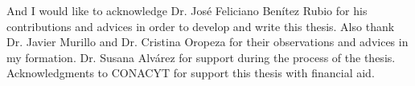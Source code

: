 
\begin{acknowledgements}      

And I would like to acknowledge Dr. Jos\'e Feliciano Ben\'itez Rubio for his contributions and advices in order to develop  and write this thesis. Also thank Dr. Javier Murillo and  Dr. Cristina Oropeza for their observations and advices in my formation. 
Dr. Susana Alv\'arez for support during the process of the thesis. Acknowledgments to CONACYT for support this thesis with financial aid. 

\end{acknowledgements}
